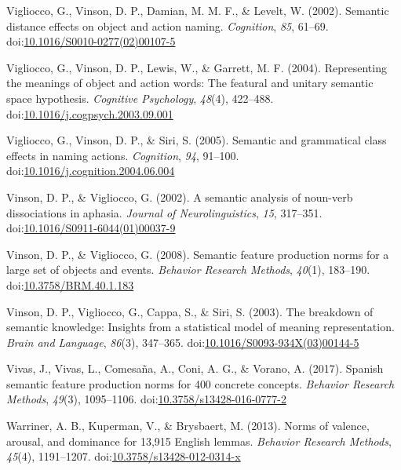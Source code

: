 \documentclass[english,,man]{apa6}
\begin{document}
\leavevmode\hypertarget{ref-Vigliocco2002}{}%
Vigliocco, G., Vinson, D. P., Damian, M. M. F., \& Levelt, W. (2002). Semantic distance effects on object and action naming. \emph{Cognition}, \emph{85}, 61--69. doi:\href{https://doi.org/10.1016/S0010-0277(02)00107-5}{10.1016/S0010-0277(02)00107-5}

\leavevmode\hypertarget{ref-Vigliocco2004}{}%
Vigliocco, G., Vinson, D. P., Lewis, W., \& Garrett, M. F. (2004). Representing the meanings of object and action words: The featural and unitary semantic space hypothesis. \emph{Cognitive Psychology}, \emph{48}(4), 422--488. doi:\href{https://doi.org/10.1016/j.cogpsych.2003.09.001}{10.1016/j.cogpsych.2003.09.001}

\leavevmode\hypertarget{ref-Vigliocco2005}{}%
Vigliocco, G., Vinson, D. P., \& Siri, S. (2005). Semantic and grammatical class effects in naming actions. \emph{Cognition}, \emph{94}, 91--100. doi:\href{https://doi.org/10.1016/j.cognition.2004.06.004}{10.1016/j.cognition.2004.06.004}

\leavevmode\hypertarget{ref-Vinson2002}{}%
Vinson, D. P., \& Vigliocco, G. (2002). A semantic analysis of noun-verb dissociations in aphasia. \emph{Journal of Neurolinguistics}, \emph{15}, 317--351. doi:\href{https://doi.org/10.1016/S0911-6044(01)00037-9}{10.1016/S0911-6044(01)00037-9}

\leavevmode\hypertarget{ref-Vinson2008}{}%
Vinson, D. P., \& Vigliocco, G. (2008). Semantic feature production norms for a large set of objects and events. \emph{Behavior Research Methods}, \emph{40}(1), 183--190. doi:\href{https://doi.org/10.3758/BRM.40.1.183}{10.3758/BRM.40.1.183}

\leavevmode\hypertarget{ref-Vinson2003}{}%
Vinson, D. P., Vigliocco, G., Cappa, S., \& Siri, S. (2003). The breakdown of semantic knowledge: Insights from a statistical model of meaning representation. \emph{Brain and Language}, \emph{86}(3), 347--365. doi:\href{https://doi.org/10.1016/S0093-934X(03)00144-5}{10.1016/S0093-934X(03)00144-5}

\leavevmode\hypertarget{ref-Vivas2017}{}%
Vivas, J., Vivas, L., Comesaña, A., Coni, A. G., \& Vorano, A. (2017). Spanish semantic feature production norms for 400 concrete concepts. \emph{Behavior Research Methods}, \emph{49}(3), 1095--1106. doi:\href{https://doi.org/10.3758/s13428-016-0777-2}{10.3758/s13428-016-0777-2}

\leavevmode\hypertarget{ref-Warriner2013}{}%
Warriner, A. B., Kuperman, V., \& Brysbaert, M. (2013). Norms of valence, arousal, and dominance for 13,915 English lemmas. \emph{Behavior Research Methods}, \emph{45}(4), 1191--1207. doi:\href{https://doi.org/10.3758/s13428-012-0314-x}{10.3758/s13428-012-0314-x}
\end{document}
